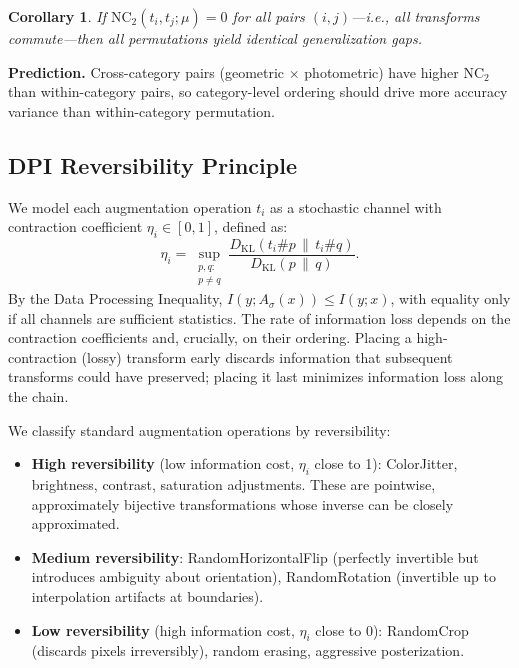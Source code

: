 \documentclass{article}
\newtheorem{corollary}{Corollary}[theorem]
\begin{document}
\begin{corollary}
If $\mathrm{NC}_2(t_i, t_j; \mu) = 0$ for all pairs $(i,j)$---i.e., all transforms commute---then all permutations yield identical generalization gaps.
\end{corollary}

\textbf{Prediction.} Cross-category pairs (geometric $\times$ photometric) have higher NC$_2$ than within-category pairs, so category-level ordering should drive more accuracy variance than within-category permutation.

\subsection{DPI Reversibility Principle}

We model each augmentation operation $t_i$ as a stochastic channel with contraction coefficient $\eta_i \in [0, 1]$, defined as:
\begin{equation}
\eta_i = \sup_{\substack{p, q:\\ p \neq q}} \frac{D_{\mathrm{KL}}(t_i \# p \,\|\, t_i \# q)}{D_{\mathrm{KL}}(p \,\|\, q)}.
\end{equation}
By the Data Processing Inequality, $I(y; A_\sigma(x)) \leq I(y; x)$, with equality only if all channels are sufficient statistics. The rate of information loss depends on the contraction coefficients and, crucially, on their ordering. Placing a high-contraction (lossy) transform early discards information that subsequent transforms could have preserved; placing it last minimizes information loss along the chain.

We classify standard augmentation operations by reversibility:

\begin{itemize}
\item \textbf{High reversibility} (low information cost, $\eta_i$ close to 1): ColorJitter, brightness, contrast, saturation adjustments. These are pointwise, approximately bijective transformations whose inverse can be closely approximated.
\item \textbf{Medium reversibility}: RandomHorizontalFlip (perfectly invertible but introduces ambiguity about orientation), RandomRotation (invertible up to interpolation artifacts at boundaries).
\item \textbf{Low reversibility} (high information cost, $\eta_i$ close to 0): RandomCrop (discards pixels irreversibly), random erasing, aggressive posterization.
\end{itemize}
\end{document}
